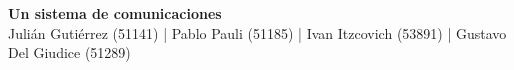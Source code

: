 \documentclass{article}
\begin{document}

\begin{center}

{ \huge \bfseries Un sistema de comunicaciones}\\[0.4cm]

\large Julián Gutiérrez (51141) |
\large Pablo Pauli (51185) |
\large Ivan Itzcovich (53891) |
\large Gustavo Del Giudice (51289)\\[0.3cm] 

\end{center}



\begin{abstract}
\par Este trabajo practico  consiste en la estimación de un canal mediante cuadrados mínimos
\end{abstract}
\end{document}
